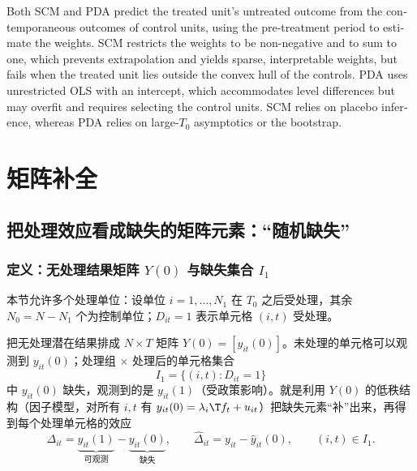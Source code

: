 \begin{english}
Both SCM and PDA predict the treated unit's untreated outcome from the contemporaneous outcomes of control units, using the pre-treatment period to estimate the weights. SCM restricts the weights to be non-negative and to sum to one, which prevents extrapolation and yields sparse, interpretable weights, but fails when the treated unit lies outside the convex hull of the controls. PDA uses unrestricted OLS with an intercept, which accommodates level differences but may overfit and requires selecting the control units. SCM relies on placebo inference, whereas PDA relies on large-$T_0$ asymptotics or the bootstrap.
\end{english}

\section{矩阵补全}\label{sec:U16-mc}

\subsection{把处理效应看成缺失的矩阵元素：“随机缺失”}

\subsubsection{定义：无处理结果矩阵 \texorpdfstring{$Y(0)$}{Y(0)} 与缺失集合 \texorpdfstring{$I_1$}{I1}}

本节允许多个处理单位：设单位 $i=1,\dots,N_1$ 在 $T_0$ 之后受处理，其余 $N_0=N-N_1$ 个为控制单位；$D_{it}=1$ 表示单元格 $(i,t)$ 受处理。

\begin{defn}[矩阵补全视角]
把无处理潜在结果排成 $N\times T$ 矩阵 $Y(0)=[y_{it}(0)]$。未处理的单元格可以观测到 $y_{it}(0)$；处理组 × 处理后的单元格集合
\[
I_1=\{(i,t):D_{it}=1\}
\]
中 $y_{it}(0)$ 缺失，观测到的是 $y_{it}(1)$（受政策影响）。就是利用 $Y(0)$ 的低秩结构（因子模型，对所有 $i,t$ 有 $y_{it}(0)=\lambda_i\T f_t+u_{it}$）把缺失元素“补”出来，再得到每个处理单元格的效应
\begin{equation}\label{eq:U16-mc-delta}
\Delta_{it}=\underbrace{y_{it}(1)}_{\text{可观测}}-\underbrace{y_{it}(0)}_{\text{缺失}},\qquad \hat\Delta_{it}=y_{it}-\hat y_{it}(0),\qquad (i,t)\in I_1 .
\end{equation}
\end{defn}

